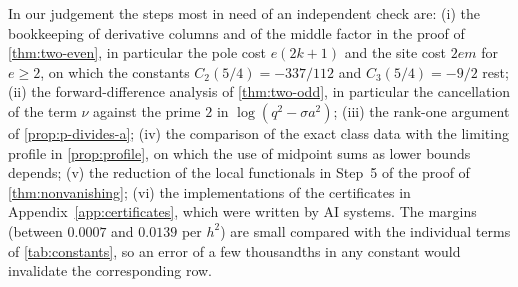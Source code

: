 \begin{remark}\label{rem:scrutiny}
In our judgement the steps most in need of an independent check are: (i) the bookkeeping of
derivative columns and of the middle factor in the proof of \cref{thm:two-even}, in particular the
pole cost $e(2k+1)$ and the site cost $2em$ for $e\ge2$, on which the constants
$C_2(5/4)=-337/112$ and $C_3(5/4)=-9/2$ rest; (ii) the forward-difference analysis of
\cref{thm:two-odd}, in particular the cancellation of the term $\nu$ against the prime $2$ in
$\log(q^2-\sigma a^2)$; (iii) the rank-one argument of \cref{prop:p-divides-a}; (iv) the comparison
of the exact class data with the limiting profile in \cref{prop:profile}, on which the use of
midpoint sums as lower bounds depends; (v) the reduction of the local functionals in Step~5 of the
proof of \cref{thm:nonvanishing}; (vi) the implementations of the certificates in
Appendix~\ref{app:certificates}, which were written by AI systems. The margins (between $0.0007$ and
$0.0139$ per $h^2$) are small compared with the individual terms of \cref{tab:constants}, so an
error of a few thousandths in any constant would invalidate the corresponding row.
\end{remark}
